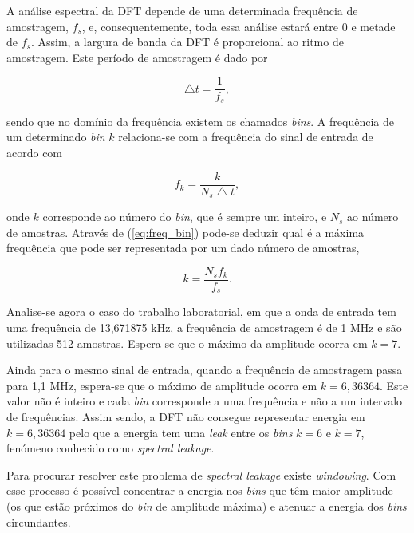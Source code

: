 \documentclass[11pt]{article}
\numberwithin{equation}{section}
\begin{document}
A análise espectral da DFT depende de uma determinada frequência de amostragem, $f_{s}$, e, consequentemente, toda essa análise estará entre $0$ e metade de $f_{s}$. Assim, a largura de banda da DFT é proporcional ao ritmo de amostragem. Este período de amostragem é dado por

\vspace{-3mm}
\begin{equation}
\bigtriangleup t = \frac{1}{f_{s}},
\end{equation}

\vspace{1mm}
sendo que no domínio da frequência existem os chamados \textit{bins}. A frequência de um determinado \textit{bin} $k$ relaciona-se com a frequência do sinal de entrada de acordo com

\vspace{-3mm}
\begin{equation}
f_{k} = \frac{k}{N_{s} \bigtriangleup t},
\label{eq:freq_bin}
\end{equation}

\vspace{1mm}
onde $k$ corresponde ao número do \textit{bin}, que é sempre um inteiro, e $N_{s}$ ao número de amostras. Através de (\ref{eq:freq_bin}) pode-se deduzir qual é a máxima frequência que pode ser representada por um dado número de amostras,

\vspace{-3mm}
\begin{equation}
k = \frac{N_{s} f_{k}}{f_{s}}.
\label{eq:max_bin}
\end{equation}

\vspace{1mm}
Analise-se agora o caso do trabalho laboratorial, em que a onda de entrada tem uma frequência de 13,671875 kHz, a frequência de amostragem é de 1 MHz e são utilizadas 512 amostras. Espera-se que o máximo da amplitude ocorra em $k = 7$.

Ainda para o mesmo sinal de entrada, quando a frequência de amostragem passa para 1,1 MHz, espera-se que o máximo de amplitude ocorra em $k = 6,36364$. Este valor não é inteiro  e cada \textit{bin} corresponde a uma frequência e não a um intervalo de frequências. Assim sendo, a DFT não consegue representar energia em $k = 6,36364$ pelo que a energia tem uma \textit{leak} entre os \textit{bins} $k = 6$ e $k = 7$, fenómeno conhecido como \textit{spectral leakage}.

Para procurar resolver este problema de \textit{spectral leakage} existe \textit{windowing}. Com esse processo é possível concentrar a energia nos \textit{bins} que têm maior amplitude (os que estão próximos do \textit{bin} de amplitude máxima) e atenuar a energia dos \textit{bins} circundantes.
\end{document}
